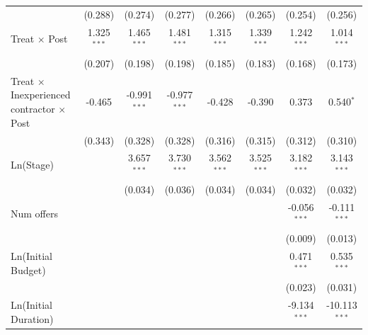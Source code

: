 \documentclass[
]{article}
\begin{document}
\begin{tabular}{lccccccc}
                                                           & (0.288)        & (0.274)        & (0.277)        & (0.266)        & (0.265)        & (0.254)        & (0.256)\\   
   Treat $\times$ Post                                     & 1.325$^{***}$  & 1.465$^{***}$  & 1.481$^{***}$  & 1.315$^{***}$  & 1.339$^{***}$  & 1.242$^{***}$  & 1.014$^{***}$\\   
                                                           & (0.207)        & (0.198)        & (0.198)        & (0.185)        & (0.183)        & (0.168)        & (0.173)\\   
   Treat $\times$ Inexperienced contractor $\times$ Post   & -0.465         & -0.991$^{***}$ & -0.977$^{***}$ & -0.428         & -0.390         & 0.373          & 0.540$^{*}$\\   
                                                           & (0.343)        & (0.328)        & (0.328)        & (0.316)        & (0.315)        & (0.312)        & (0.310)\\   
   Ln(Stage)                                               &                & 3.657$^{***}$  & 3.730$^{***}$  & 3.562$^{***}$  & 3.525$^{***}$  & 3.182$^{***}$  & 3.143$^{***}$\\   
                                                           &                & (0.034)        & (0.036)        & (0.034)        & (0.034)        & (0.032)        & (0.032)\\   
   Num offers                                              &                &                &                &                &                & -0.056$^{***}$ & -0.111$^{***}$\\   
                                                           &                &                &                &                &                & (0.009)        & (0.013)\\   
   Ln(Initial Budget)                                      &                &                &                &                &                & 0.471$^{***}$  & 0.535$^{***}$\\   
                                                           &                &                &                &                &                & (0.023)        & (0.031)\\   
   Ln(Initial Duration)                                    &                &                &                &                &                & -9.134$^{***}$ & -10.113$^{***}$\\   

\end{tabular}
\end{document}
